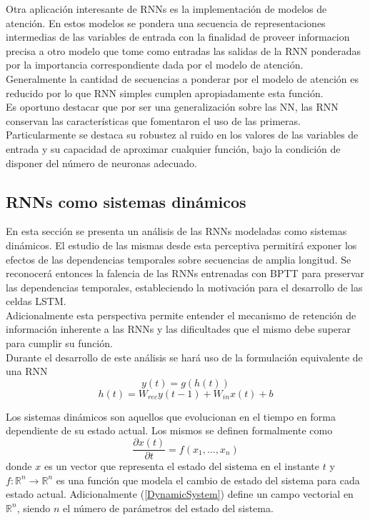\documentclass{article}
\begin{document}
	Otra aplicación interesante de RNNs es la implementación de modelos de atención. En estos modelos se pondera una secuencia de representaciones intermedias de las variables de entrada con la finalidad de proveer informacion precisa a otro modelo que tome como entradas las salidas de la RNN ponderadas por la importancia correspondiente dada por el modelo de atención.\\
	Generalmente la cantidad de secuencias a ponderar por el modelo de atención es reducido por lo que RNN simples cumplen apropiadamente esta función.\\
	
	Es oportuno destacar que por ser una generalización sobre las NN, las RNN conservan las características que fomentaron el uso de las primeras. Particularmente se destaca su robustez al ruido en los valores de las variables de entrada y su capacidad de aproximar cualquier función, bajo la condición de disponer del número de neuronas adecuado.\\
	
	
	\subsection{RNNs como sistemas dinámicos}
	En esta sección se presenta un análisis de las RNNs modeladas como sistemas dinámicos. El estudio de las mismas desde esta perceptiva permitirá exponer los efectos de las dependencias temporales sobre secuencias de amplia longitud. Se reconocerá entonces la falencia de las RNNs entrenadas con BPTT para preservar las dependencias temporales, estableciendo la motivación para el desarrollo de las celdas LSTM.\\
	Adicionalmente esta perspectiva permite entender el mecanismo de retención de información inherente a las RNNs y las dificultades que el mismo debe superar para cumplir su función.\\
	Durante el desarrollo de este análisis se hará uso de la formulación equivalente de una RNN\cite{10Pascanu}
	\begin{equation*}
	y(t) = g(h(t))
	\end{equation*}
	\begin{equation}\label{ReparametrizacionRNN}
	h(t) = W_{rec} y(t-1) + W_{in} x(t) + b
	\end{equation}
	
	Los sistemas dinámicos son aquellos que evolucionan en el tiempo en forma dependiente de su estado actual. Los mismos se definen formalmente como\cite{21StrogatzBook}\\
	\begin{equation}\label{DynamicSystem}
	\dfrac{\partial x(t)}{\partial t} = f(x_1, ... , x_n)
	\end{equation}
	donde $x$ es un vector que representa el estado del sistema en el instante $t$ y $f : \mathbb{R}^{n} \rightarrow \mathbb{R}^{n}$ es una función que modela el cambio de estado del sistema para cada estado actual. Adicionalmente (\ref{DynamicSystem}) define un campo vectorial en $\mathbb{R}^{n}$, siendo $n$ el número de parámetros del estado del sistema.\\
	
\end{document}
